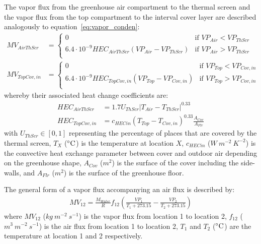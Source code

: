 \documentclass[a4paper]{article}
\numberwithin{equation}{section}
\begin{document}
The vapor flux from the greenhouse air compartment to the thermal screen and the vapor flux from the top compartment to the interval cover layer are described analogously to equation~\eqref{eq:vapor_conden}:
\begin{align}
  MV_{AirThScr}  & = \begin{cases}
    0                                                       & \text{if~} VP_{Air} < VP_{ThScr} \\
    6.4 \cdot 10^{-9} HEC_{AirThScr}(VP_{Air} - VP_{ThScr}) & \text{if~} VP_{Air} > VP_{ThScr} \\
  \end{cases} \\
  MV_{TopCov,in} & = \begin{cases}
    0                                                         & \text{if~} VP_{Top} < VP_{Cov,in} \\
    6.4 \cdot 10^{-9} HEC_{TopCov,in}(VP_{Top} - VP_{Cov,in}) & \text{if~} VP_{Top} > VP_{Cov,in} \\
  \end{cases}
\end{align}
whereby their associated heat change coefficients are:
\begin{align}
  HEC_{AirThScr}  & = 1.7 U_{ThScr} |T_{Air} - T_{ThScr}|^{0.33}                        \\
  HEC_{TopCov,in} & = {c_{HECin} (T_{Top} - T_{Cov,in})}^{0.33} \frac{A_{Cov}}{A_{Flr}}
\end{align}
with \( U_{ThScr} \in [0,1] \) representing the percentage of places that are covered by the thermal screen, \( T_X \) (\( \celsius \)) is the temperature at location \( X \), \( c_{HECin} \) (\( W\ m^{-2}\ K^{-2} \)) is the convective heat exchange parameter between cover and outdoor air depending on the greenhouse shape, \( A_{Cov} \) (\( m^2 \)) is the surface of the cover including the side-walls, and \( A_{Flr} \) (\( m^2 \)) is the surface of the greenhouse floor.

The general form of a vapor flux accompanying an air flux is described by:
\begin{align}
  \label{eq:vapor_air}
  MV_{12} = \frac{M_{Water}}{R} f_{12} \left(\frac{VP_1}{T_1 + 273.15} - \frac{VP_2}{T_2 + 273.15}\right)
\end{align}
where \( MV_{12} \) (\( kg\ m^{-2}\ s^{-1} \)) is the vapor flux from location 1 to location 2, \( f_{12} \) (\( m^3\ m^{-2}\ s^{-1} \)) is the air flux from location 1 to location 2, \( T_1 \) and \( T_2 \) (\( \celsius \)) are the temperature at location 1 and 2 respectively.
\end{document}
